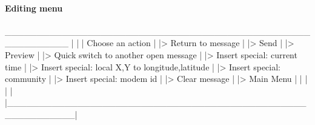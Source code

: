 \paragraph{Editing menu}
\begin{boxedverbatim}
        __________________________________________________________
       |                                                          |
       |                     Choose an action                     |
       |> Return to message                                       |
       |> Send                                                    |
       |> Preview                                                 |
       |> Quick switch to another open message                    |
       |> Insert special: current time                            |
       |> Insert special: local X,Y to longitude,latitude         |
       |> Insert special: community                               |
       |> Insert special: modem id                                |
       |> Clear message                                           |
       |> Main Menu                                               |
       |                                                          |
       |                                                          |
       |__________________________________________________________|
\end{boxedverbatim}
\resetbvlinenumber
